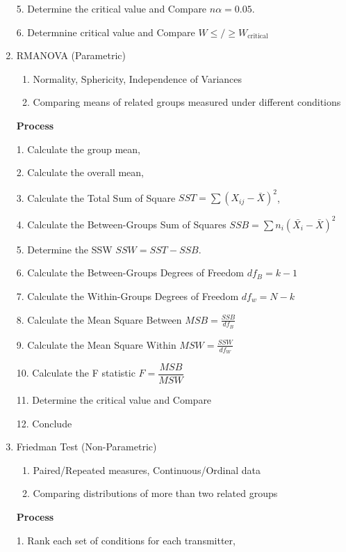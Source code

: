 \documentclass[6pt]{article}
\begin{document}
\begin{multicols*}{2}
\begin{enumerate}
            5. Determine the critical value and Compare $n \alpha = 0.05$.
            
            6. Determnine critical value and Compare $W \leq/\geq W_{\text{critical}}$

        \item RMANOVA (Parametric)
        \begin{enumerate}
            \item Normality, Sphericity, Independence of Variances
            \item Comparing means of related groups measured under different conditions
        \end{enumerate}
        \textbf{Process}

        1. Calculate the group mean,

        2. Calculate the overall mean, 

        3. Calculate the Total Sum of Square $\displaystyle SST = \sum{(X_{ij} - \bar{X})^2}$,

        4. Calculate the Between-Groups Sum of Squares $\displaystyle SSB = \sum{n_i(\bar{X_i}-\bar{X})^2}$

        5. Determine the SSW $SSW = SST - SSB$.
        
        6. Calculate the Between-Groups Degrees of Freedom $\displaystyle df_B = k - 1$

        7. Calculate the Within-Groups Degrees of Freedom $\displaystyle df_w = N - k$

        8. Calculate the Mean Square Between $\displaystyle MSB = \frac{SSB}{df_B}$

        9. Calculate the Mean Square Within $\displaystyle MSW = \frac{SSW}{df_W}$

        10. Calculate the F statistic $\displaystyle F = \dfrac{MSB}{MSW}$

        11. Determine the critical value and Compare

        12. Conclude

        \item Friedman Test (Non-Parametric)
        \begin{enumerate}
            \item Paired/Repeated measures, Continuous/Ordinal data
            \item Comparing distributions of more than two related groups
        \end{enumerate}
        \textbf{Process}
            
        1. Rank each set of conditions for each transmitter, 
    

\end{enumerate}
\end{multicols*}
\end{document}
